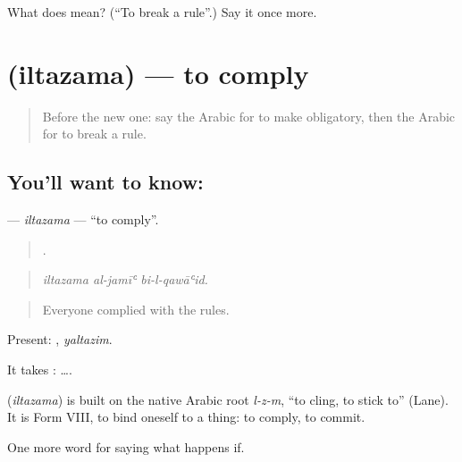 \begin{tcolorbox}[breakable,colback=teal!4,colframe=teal!35!black,title={Before you move on}]
What does  mean? (\textquotedblleft{}To break a rule\textquotedblright{}.) Say it once more.
\end{tcolorbox}
\section[\texorpdfstring{\ar{التزم} (iltazama)}{التزم (iltazama)}]{ (iltazama) — to comply}

\label{lesson:AR-C410-iltazama}



\begin{quote}
Before the new one: say the Arabic for to make obligatory, then the Arabic for to break a rule.
\end{quote}

\subsection*{You'll want to know: }
\textbf{} — \emph{iltazama} — \textquotedblleft{}to comply\textquotedblright{}.

\begin{quote}
  .
\end{quote}

\begin{quote}
\emph{iltazama al-jamīʿ bi-l-qawāʿid.}
\end{quote}

\begin{quote}
Everyone complied with the rules.
\end{quote}

Present: , \emph{yaltazim}.

It takes :   ….

\begin{cousinweb}
\textbf{} (\emph{iltazama}) is built on the native Arabic root \emph{l-z-m}, \textquotedblleft{}to cling, to stick to\textquotedblright{} (Lane). It is Form VIII, to bind oneself to a thing: to comply, to commit.
\end{cousinweb}

\begin{grammarlens}[title={What you've built}]
One more word for saying what happens if.
\end{grammarlens}

